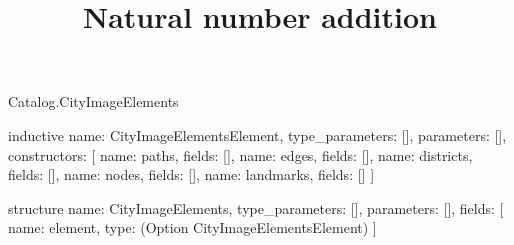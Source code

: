 \begin{lexlean}{Catalog.CityImageElements}
\title{Natural number addition}
\begin{semanticmodule}
inductive{
  name: CityImageElementsElement,
  type_parameters: [],
  parameters: [],
  constructors: [
    {name: paths, fields: []},
    {name: edges, fields: []},
    {name: districts, fields: []},
    {name: nodes, fields: []},
    {name: landmarks, fields: []}
  ]
}

structure{
  name: CityImageElements,
  type_parameters: [],
  parameters: [],
  fields: [
    {name: element, type: (Option CityImageElementsElement)}
  ]
}
\end{semanticmodule}
\end{lexlean}
